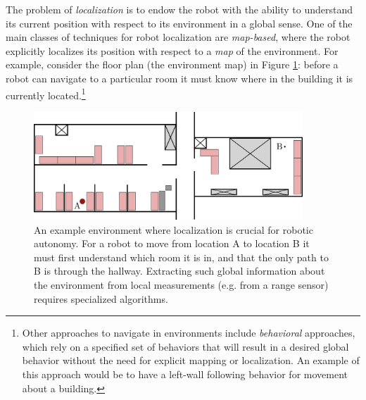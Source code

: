The problem of \textit{localization} is to endow the robot with the ability to understand its current position with respect to its environment in a global sense\cite{ThrunBurgardEtAl2005}\cite{SiegwartNourbakhshEtAl2011}.
One of the main classes of techniques for robot localization are \textit{map-based}, where the robot explicitly localizes its position with respect to a \textit{map} of the environment.
For example, consider the floor plan (the environment map) in Figure \ref{fig:sample-room}: before a robot can navigate to a particular room it must know where in the building it is currently located.\footnote{Other approaches to navigate in environments include \textit{behavioral} approaches, which rely on a specified set of behaviors that will result in a desired global behavior without the need for explicit mapping or localization. An example of this approach would be to have a left-wall following behavior for movement about a building.}
\begin{figure}[ht]
	\centering
    \includegraphics[width=0.9\textwidth]{tex/figs/ch14_figs/map.png}
    \caption{An example environment where localization is crucial for robotic autonomy. For a robot to move from location A to location B it must first understand which room it is in, and that the only path to B is through the hallway. Extracting such global information about the environment from local measurements (e.g. from a range sensor) requires specialized algorithms.}
    \label{fig:sample-room}
\end{figure}

